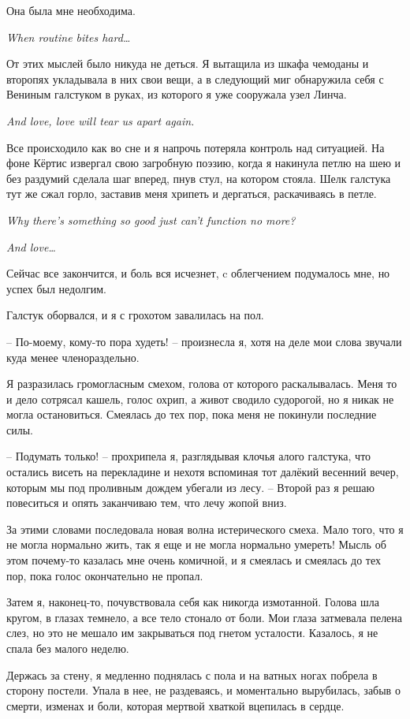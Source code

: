 \documentclass[
]{book}
\begin{document}
Она была мне необходима.

\emph{When routine bites hard\ldots{}}

От этих мыслей было никуда не деться. Я вытащила из шкафа чемоданы и второпях укладывала в них свои вещи, а в следующий миг обнаружила себя с Вениным галстуком в руках, из которого я уже сооружала узел Линча.

\emph{And love, love will tear us apart again.}

Все происходило как во сне и я напрочь потеряла контроль над ситуацией. На фоне Кёртис извергал свою загробную поэзию, когда я накинула петлю на шею и без раздумий сделала шаг вперед, пнув стул, на котором стояла. Шелк галстука тут же сжал горло, заставив меня хрипеть и дергаться, раскачиваясь в петле.

\emph{Why there's something so good just can't function no more?}

\emph{And love\ldots{}}

Сейчас все закончится, и боль вся исчезнет, c облегчением подумалось мне, но успех был недолгим.

Галстук оборвался, и я с грохотом завалилась на пол.

-- По-моему, кому-то пора худеть! -- произнесла я, хотя на деле мои слова звучали куда менее членораздельно.

Я разразилась громогласным смехом, голова от которого раскалывалась. Меня то и дело сотрясал кашель, голос охрип, а живот сводило судорогой, но я никак не могла остановиться. Смеялась до тех пор, пока меня не покинули последние силы.

-- Подумать только! -- прохрипела я, разглядывая клочья алого галстука, что остались висеть на перекладине и нехотя вспоминая тот далёкий весенний вечер, которым мы под проливным дождем убегали из лесу. -- Второй раз я решаю повеситься и опять заканчиваю тем, что лечу жопой вниз.

За этими словами последовала новая волна истерического смеха. Мало того, что я не могла нормально жить, так я еще и не могла нормально умереть! Мысль об этом почему-то казалась мне очень комичной, и я смеялась и смеялась до тех пор, пока голос окончательно не пропал.

Затем я, наконец-то, почувствовала себя как никогда измотанной. Голова шла кругом, в глазах темнело, а все тело стонало от боли. Мои глаза затмевала пелена слез, но это не мешало им закрываться под гнетом усталости. Казалось, я не спала без малого неделю.

Держась за стену, я медленно поднялась с пола и на ватных ногах побрела в сторону постели. Упала в нее, не раздеваясь, и моментально вырубилась, забыв о смерти, изменах и боли, которая мертвой хваткой вцепилась в сердце.
\end{document}
